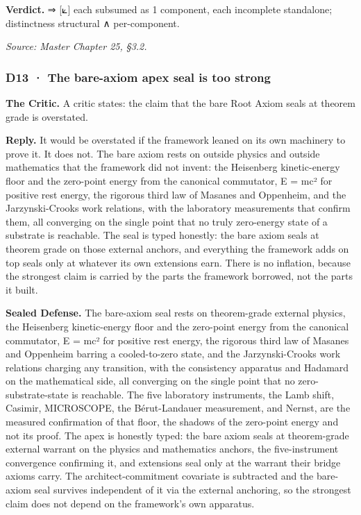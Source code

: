 \documentclass[10pt,twocolumn]{article}
\begin{document}
\textbf{Verdict.} ⇒ {[}⟀{]} each subsumed as 1 component, each
incomplete standalone; distinctness structural ∧ per-component.

\emph{Source: Master Chapter 25, §3.2.}

\hypertarget{d13-the-bare-axiom-apex-seal-is-too-strong}{%
\subsubsection{D13 · The bare-axiom apex seal is too
strong}\label{d13-the-bare-axiom-apex-seal-is-too-strong}}

\textbf{The Critic.} A critic states: the claim that the bare Root Axiom
seals at theorem grade is overstated.

\textbf{Reply.} It would be overstated if the framework leaned on its
own machinery to prove it. It does not. The bare axiom rests on outside
physics and outside mathematics that the framework did not invent: the
Heisenberg kinetic-energy floor and the zero-point energy from the
canonical commutator, E = mc² for positive rest energy, the rigorous
third law of Masanes and Oppenheim, and the Jarzynski-Crooks work
relations, with the laboratory measurements that confirm them, all
converging on the single point that no truly zero-energy state of a
substrate is reachable. The seal is typed honestly: the bare axiom seals
at theorem grade on those external anchors, and everything the framework
adds on top seals only at whatever its own extensions earn. There is no
inflation, because the strongest claim is carried by the parts the
framework borrowed, not the parts it built.

\textbf{Sealed Defense.} The bare-axiom seal rests on theorem-grade
external physics, the Heisenberg kinetic-energy floor and the zero-point
energy from the canonical commutator, E = mc² for positive rest energy,
the rigorous third law of Masanes and Oppenheim barring a cooled-to-zero
state, and the Jarzynski-Crooks work relations charging any transition,
with the consistency apparatus and Hadamard on the mathematical side,
all converging on the single point that no zero-substrate-state is
reachable. The five laboratory instruments, the Lamb shift, Casimir,
MICROSCOPE, the Bérut-Landauer measurement, and Nernst, are the measured
confirmation of that floor, the shadows of the zero-point energy and not
its proof. The apex is honestly typed: the bare axiom seals at
theorem-grade external warrant on the physics and mathematics anchors,
the five-instrument convergence confirming it, and extensions seal only
at the warrant their bridge axioms carry. The architect-commitment
covariate is subtracted and the bare-axiom seal survives independent of
it via the external anchoring, so the strongest claim does not depend on
the framework's own apparatus.
\end{document}
